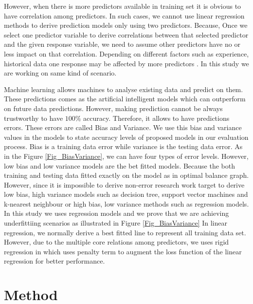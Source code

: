 However, when there is more predictors available in training set it is obvious to have correlation among predictors. 
In such cases, we cannot use linear regression methods to 
derive prediction models only using two predictors.
Because, Once we select one predictor variable to derive 
correlations between that 
selected predictor and the given response variable, we need to 
assume other predictors have no or less impact on that correlation.
Depending on different factors such as experience, historical 
data one response may be affected by more predictors \cite{seber2012linear}. 
In this study we are working on same kind of scenario.

Machine learning allows machines to analyse existing data and 
predict on them. These predictions comes as the 
artificial intelligent models which can outperform on future data predictions. 
However, making prediction cannot be always trustworthy 
to have $100\%$ accuracy. 
Therefore, it allows to have predictions errors. 
These errors are called Bias and Variance.
We use this bias and variance values in the models to state 
accuracy levels of proposed models in our evaluation process.
Bias is a training data error while variance is the testing data error.
As in the Figure \ref{Fig_BiasVariance}, we can have four types of error levels.
However, low bias and low variance models are the bet fitted models.
Because the both training and testing data fitted exactly on
the model as in optimal balance graph.
However, since it is impossible to derive non-error research
work target to derive low bias, high variance models such as
decision tree, support vector machines and k-nearest neighbour or high bias, low variance methods such as regression models.
In this study we uses regression models and we prove that
we are achieving underfittiing scenarios as illustrated in Figure \ref{Fig_BiasVariance}
In linear regression, we normally derive a best fitted line to represent all training data set.
However, due to the multiple core relations among predictors, we uses rigid regression in which uses penalty term to 
augment the loss function of the linear regression for better performance.

\gliMarker  %

\section{Method} \label{sec-method}

